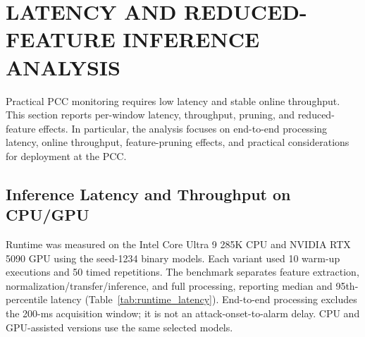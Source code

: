 \documentclass[letterpaper,journal]{IEEEtran}
\begin{document}
\section{LATENCY AND REDUCED-FEATURE INFERENCE ANALYSIS}
\label{sec:realtime}
Practical PCC monitoring requires low latency and stable online throughput. This section reports per-window latency, throughput, pruning, and reduced-feature effects. In particular, the analysis focuses on end-to-end processing latency, online throughput, feature-pruning effects, and practical considerations for deployment at the PCC. 

\subsection{Inference Latency and Throughput on CPU/GPU}
\label{sec:latency_throughput}

Runtime was measured on the Intel Core Ultra 9 285K CPU and NVIDIA RTX 5090 GPU using the seed-1234 binary models. Each variant used 10 warm-up executions and 50 timed repetitions. The benchmark separates feature extraction, normalization/transfer/inference, and full processing, reporting median and 95th-percentile latency (Table~\ref{tab:runtime_latency}). End-to-end processing excludes the 200-ms acquisition window; it is not an attack-onset-to-alarm delay. CPU and GPU-assisted versions use the same selected models.
\end{document}
